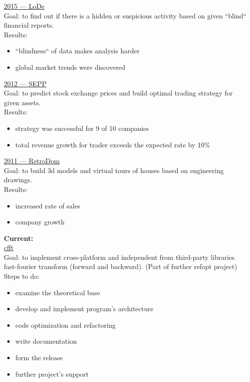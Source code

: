 \documentclass[a4paper,12pt,fullpage]{article}
\begin{document}
\underline{2015 --- LoDe}\\
Goal: to find out if there is a hidden or suspicious activity  based on given ``blind`` financial reports.\\
Results:
\begin{itemize}
	\item ``blindness`` of data makes analysis harder
	\item global market trends were discovered\\
\end{itemize}

\underline{2012 --- SEPP}\\
Goal: to predict stock exchange prices and build optimal trading strategy for given assets.\\
Results: 
\begin{itemize}
	\item strategy was successful for 9 of 10 companies
	\item total revenue growth for trader exceeds the expected rate by 10\%\\
\end{itemize}


\underline{2011 --- RetroDom}\\
Goal: to build 3d models and virtual tours of houses based on engineering drawings.\\
Results: 
\begin{itemize}
	\item increased rate of sales
	\item company growth\\
\end{itemize}

\textbf{Current:}\\
\underline{cfft}\\
Goal: to implement cross-platform and independent from third-party libraries fast-fourier transform (forward and backward). (Part of further refopt project)\\
Steps to do:
\begin{itemize}
	\item examine the theoretical base
	\item develop and implement program's architecture
	\item code optimization and refactoring
	\item write documentation
	\item form the release
	\item further project's support\\
\end{itemize}
\end{document}
